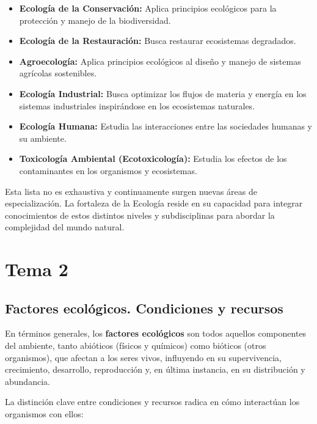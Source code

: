 \documentclass[
]{book}
\providecommand{\tightlist}{%
  \setlength{\itemsep}{0pt}\setlength{\parskip}{0pt}}
\begin{document}
\begin{itemize}
  \begin{itemize}
  \tightlist
  \item
    \textbf{Ecología de la Conservación:} Aplica principios ecológicos para la protección y manejo de la biodiversidad.
  \item
    \textbf{Ecología de la Restauración:} Busca restaurar ecosistemas degradados.
  \item
    \textbf{Agroecología:} Aplica principios ecológicos al diseño y manejo de sistemas agrícolas sostenibles.
  \item
    \textbf{Ecología Industrial:} Busca optimizar los flujos de materia y energía en los sistemas industriales inspirándose en los ecosistemas naturales.
  \item
    \textbf{Ecología Humana:} Estudia las interacciones entre las sociedades humanas y su ambiente.
  \item
    \textbf{Toxicología Ambiental (Ecotoxicología):} Estudia los efectos de los contaminantes en los organismos y ecosistemas.
  \end{itemize}
\end{itemize}

Esta lista no es exhaustiva y continuamente surgen nuevas áreas de especialización. La fortaleza de la Ecología reside en su capacidad para integrar conocimientos de estos distintos niveles y subdisciplinas para abordar la complejidad del mundo natural.

\chapter*{Tema 2}\label{tema2}

\section*{Factores ecológicos. Condiciones y recursos}\label{condrec}

En términos generales, los \textbf{factores ecológicos} son todos aquellos componentes del ambiente, tanto abióticos (físicos y químicos) como bióticos (otros organismos), que afectan a los seres vivos, influyendo en su supervivencia, crecimiento, desarrollo, reproducción y, en última instancia, en su distribución y abundancia.

La distinción clave entre condiciones y recursos radica en cómo interactúan los organismos con ellos:
\end{document}
